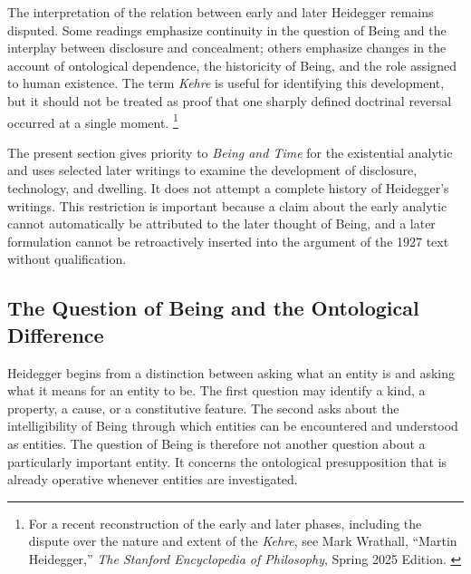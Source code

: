 \label{para:VS.B01.P01.C08.S11.SS02.P003}

The interpretation of the relation between early and
later Heidegger remains disputed. Some readings emphasize
continuity in the question of Being and the interplay
between disclosure and concealment; others emphasize
changes in the account of ontological dependence, the
historicity of Being, and the role assigned to human
existence. The term \textit{Kehre} is useful for identifying
this development, but it should not be treated as proof
that one sharply defined doctrinal reversal occurred
at a single moment.
\footnote{For a recent reconstruction of the early and
later phases, including the dispute over the nature and
extent of the \textit{Kehre}, see Mark Wrathall,
``Martin Heidegger,'' \textit{The Stanford Encyclopedia
of Philosophy}, Spring 2025 Edition. \cite{WrathallHeideggerSEP2025}}

\label{para:VS.B01.P01.C08.S11.SS02.P004}

The present section gives priority to \textit{Being and Time}
for the existential analytic and uses selected later
writings to examine the development of disclosure,
technology, and dwelling. It does not attempt a complete
history of Heidegger's writings. This restriction is
important because a claim about the early analytic cannot
automatically be attributed to the later thought of Being,
and a later formulation cannot be retroactively inserted
into the argument of the 1927 text without qualification.



\subsection{The Question of Being and the Ontological Difference}
\label{subsec:ch08-heidegger-ontological-difference}

\label{para:VS.B01.P01.C08.S11.SS03.P001}

Heidegger begins from a distinction between asking what
an entity is and asking what it means for an entity to be.
The first question may identify a kind, a property, a cause,
or a constitutive feature. The second asks about the
intelligibility of Being through which entities can be
encountered and understood as entities. The question of
Being is therefore not another question about a particularly
important entity. It concerns the ontological presupposition
that is already operative whenever entities are investigated.
\cite[Introduction, §§1--4]{HeideggerBeingTime}

